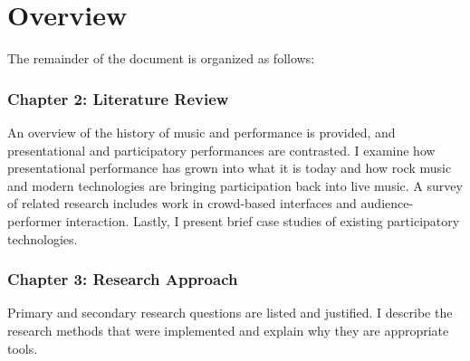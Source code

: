 

\section{Overview}

The remainder of the document is organized as follows:

\subsubsection{Chapter 2: Literature Review}
	
An overview of the history of music and performance is provided, and presentational and participatory performances are contrasted. I examine how presentational performance has grown into what it is today and how rock music and modern technologies are bringing participation back into live music. A survey of related research includes work in crowd-based interfaces and audience-performer interaction. Lastly, I present brief case studies of existing participatory technologies.
	
\subsubsection{Chapter 3: Research Approach}
	
Primary and secondary research questions are listed and justified. I describe the research methods that were implemented and explain why they are appropriate tools.
			
